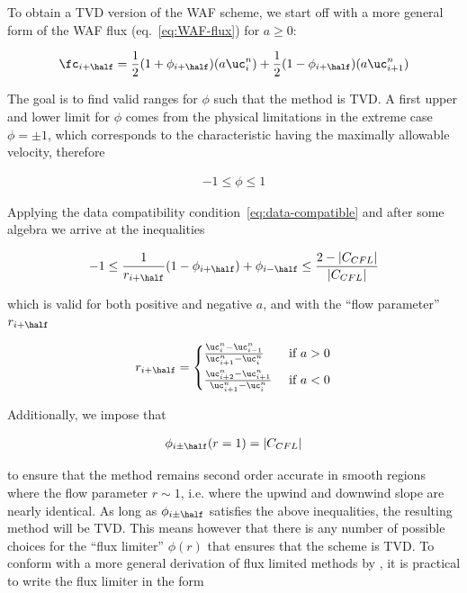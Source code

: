To obtain a TVD version of the WAF scheme, we start off with a more general form of the WAF flux
(eq.~\ref{eq:WAF-flux}) for $a \geq 0$:

\begin{align}
    \fc_{i+\half} = \frac{1}{2} (1 + \phi_{i+\half})(a \uc_i^n) + \frac{1}{2} (1 - \phi_{i+\half})
(a \uc_{i+1}^n)
\end{align}

The goal is to find valid ranges for $\phi$ such that the method is TVD. A first upper and lower
limit for $\phi$ comes from the physical limitations in the extreme case $\phi = \pm 1$, which
corresponds to the characteristic having the maximally allowable velocity, therefore

\begin{align}
    -1 \leq \phi \leq 1
\end{align}


Applying the data compatibility condition~\ref{eq:data-compatible} and after some algebra we arrive
at the inequalities

\begin{align}
    -1 \leq \frac{1}{r_{i+\half}} (1 - \phi_{i+\half}) + \phi_{i-\half} \leq \frac{2 -
|C_{CFL}|}{|C_{CFL}|}
\end{align}

which is valid for both positive and negative $a$, and with the ``flow parameter'' $r_{i+\half}$

\begin{align}
    r_{i+\half} = \begin{cases}
                   \frac{\uc_i^n - \uc_{i-1}^n}{\uc_{i+1}^n - \uc_i^n} & \text{ if } a > 0 \\[6pt]
                   \frac{\uc_{i+2}^n - \uc_{i+1}^n}{\uc_{i+1}^n - \uc_i^n} & \text{ if } a < 0 \\
                  \end{cases}
\end{align}


Additionally, we impose that

\begin{align}
    \phi_{i\pm\half}(r = 1) = |C_{CFL}|
\end{align}

to ensure that the method remains second order accurate in smooth regions where the flow parameter
$r \sim 1$, i.e. where the upwind and downwind slope are nearly identical. As long as
$\phi_{i\pm\half}$ satisfies the above inequalities, the resulting method will be TVD. This means
however that there is any number of possible choices for the ``flux limiter'' $\phi(r)$ that
ensures that the scheme is TVD. To conform with a more general derivation of flux limited methods
by \citet{swebyHighResolutionSchemes1984}, it is practical to write the flux limiter in the form

